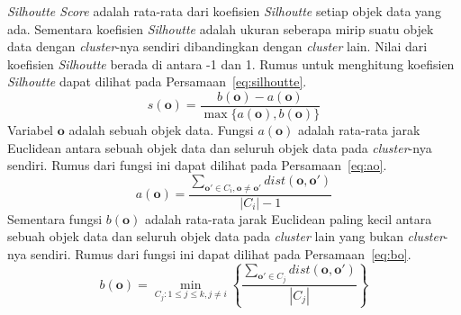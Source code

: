 \textit{Silhoutte Score} adalah rata-rata dari koefisien \textit{Silhoutte} setiap objek data yang ada. Sementara koefisien \textit{Silhoutte} adalah ukuran seberapa mirip suatu objek data dengan \textit{cluster}-nya sendiri dibandingkan dengan \textit{cluster} lain. Nilai dari koefisien \textit{Silhoutte} berada di antara -1 dan 1. Rumus untuk menghitung koefisien \textit{Silhoutte} dapat dilihat pada Persamaan~\ref{eq:silhoutte}.~\cite{jiawei:12:datmin}
\begin{equation}\label{eq:silhoutte}
	s(\mathbf{o}) = \frac{b(\mathbf{o})-a(\mathbf{o})}{\max{\{a(\mathbf{o}),b(\mathbf{o})}\}}
\end{equation}
Variabel \(\mathbf{o}\) adalah sebuah objek data. Fungsi \(a(\mathbf{o})\) adalah rata-rata jarak Euclidean antara sebuah objek data dan seluruh objek data pada \textit{cluster}-nya sendiri. Rumus dari fungsi ini dapat dilihat pada Persamaan~\ref{eq:ao}.
\begin{equation}\label{eq:ao}
	a(\mathbf{o}) = \frac{\sum^{}_{\mathbf{o'} \in C_{i},\mathbf{o}\neq\mathbf{o'}}dist(\mathbf{o},\mathbf{o'})}{|C_{i}|-1}
\end{equation}
Sementara fungsi \(b(\mathbf{o})\) adalah rata-rata jarak Euclidean paling kecil antara sebuah objek data dan seluruh objek data pada \textit{cluster} lain yang bukan \textit{cluster}-nya sendiri. Rumus dari fungsi ini dapat dilihat pada Persamaan~\ref{eq:bo}.
\begin{equation}\label{eq:bo}
	b(\mathbf{o}) = \min_{C_{j}:1\leq j \leq k,j\neq i}\left\{\frac{\sum^{}_{\mathbf{o'} \in C_{j}}dist(\mathbf{o},\mathbf{o'})}{|C_{j}|}\right\}
\end{equation}

